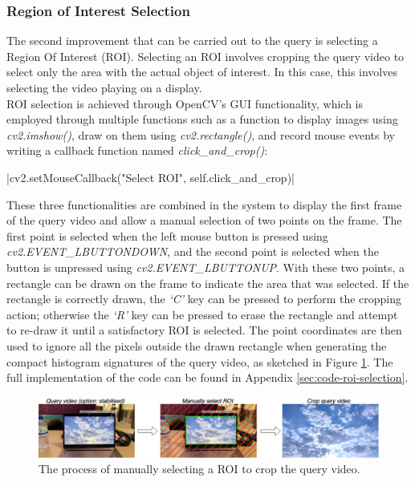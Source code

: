 \subsubsection{Region of Interest Selection}

The second improvement that can be carried out to the query is selecting a Region Of Interest (ROI). Selecting an ROI involves cropping the query video to select only the area with the actual object of interest. In this case, this involves selecting the video playing on a display.\\

ROI selection is achieved through OpenCV's GUI functionality, which is employed through multiple functions such as a function to display images using \textit{cv2.imshow()}, draw on them using \textit{cv2.rectangle()}, and record mouse events by writing a callback function named \textit{click\_and\_crop()}:

|cv2.setMouseCallback("Select ROI", self.click_and_crop)|

These three functionalities are combined in the system to display the first frame of the query video and allow a manual selection of two points on the frame. The first point is selected when the left mouse button is pressed using \textit{cv2.EVENT\_LBUTTONDOWN}, and the second point is selected when the button is unpressed using \textit{cv2.EVENT\_LBUTTONUP}. With these two points, a rectangle can be drawn on the frame to indicate the area that was selected. If the rectangle is correctly drawn, the \textit{`C'} key can be pressed to perform the cropping action; otherwise the \textit{`R'} key can be pressed to erase the rectangle and attempt to re-draw it until a satisfactory ROI is selected. The point coordinates are then used to ignore all the pixels outside the drawn rectangle when generating the compact histogram signatures of the query video, as sketched in Figure \ref{fig:implementation-roi_selection}. The full implementation of the code can be found in Appendix \ref{sec:code-roi-selection}.\\

\begin{figure}[h] 
\centerline{\includegraphics[width=\textwidth]{figures/implementation/roi_selection.png}}
\caption{\label{fig:implementation-roi_selection}The process of manually selecting a ROI to crop the query video.}
\end{figure}

